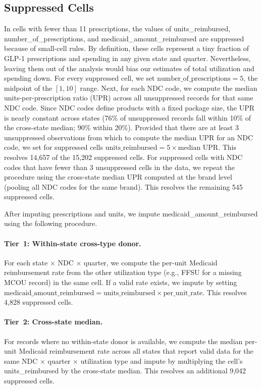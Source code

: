 

\subsection{Suppressed Cells}

In cells with fewer than 11 prescriptions, the values of units\_reimbursed, number\_of\_prescriptions, and medicaid\_amount\_reimbursed are suppressed because of small-cell rules. By definition, these cells represent a tiny fraction of GLP-1 prescriptions and spending in any given state and quarter. Nevertheless, leaving them out of the analysis would bias our estimates of total utilization and spending down. For every suppressed cell, we set $\text{number\_of\_prescriptions} = 5$, the midpoint of the $[1, 10]$ range. Next, for each NDC code, we compute the median units-per-prescription ratio (UPR) across all unsuppressed records for that same NDC code. Since NDC codes define products with a fixed package size, the UPR is nearly constant across states (76\% of unsuppressed records fall within 10\% of the cross-state median; 90\% within 20\%). Provided that there are at least 3 unsuppressed observations from which to compute the median UPR for an NDC code, we set for suppressed cells $\text{units\_reimbursed} = 5 \times \text{median UPR}$. This resolves 14{,}657 of the 15{,}202 suppressed cells. For suppressed cells with NDC codes that have fewer than 3 unsuppressed cells in the data, we repeat the procedure using the cross-state median UPR computed at the brand level (pooling all NDC codes for the same brand). This resolves the remaining 545 suppressed cells. 

After imputing prescriptions and units, we impute medicaid\_amount\_reimbursed using the following procedure.

\paragraph{Tier~1: Within-state cross-type donor.} For each state $\times$ NDC $\times$ quarter, we compute the per-unit Medicaid reimbursement rate from the other utilization type (e.g., FFSU for a missing MCOU record) in the same cell. If a valid rate exists, we impute by setting $\text{medicaid\_amount\_reimbursed} = \text{units\_reimbursed} \times \text{per\_unit\_rate}$. This resolves 4{,}828 suppressed cells.

\paragraph{Tier~2: Cross-state median.} For records where no within-state donor is available, we compute the median per-unit Medicaid reimbursement rate across all states that report valid data for the same NDC $\times$ quarter $\times$ utilization type and impute by multiplying the cell's units\_reimbursed by the cross-state median. This resolves an additional 9{,}042 suppressed cells.

